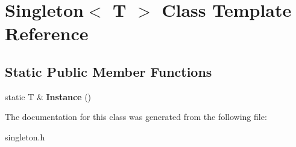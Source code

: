 \hypertarget{class_singleton}{\section{Singleton$<$ T $>$ Class Template Reference}
\label{class_singleton}
}
\subsection*{Static Public Member Functions}
\begin{DoxyCompactItemize}
\item 
\hypertarget{class_singleton_a131e87528259529400d58b6df5d9743c}{static T \& {\bfseries Instance} ()}\label{class_singleton_a131e87528259529400d58b6df5d9743c}

\end{DoxyCompactItemize}


The documentation for this class was generated from the following file\-:\begin{DoxyCompactItemize}
\item 
singleton.\-h\end{DoxyCompactItemize}
